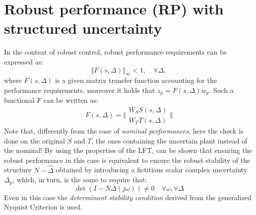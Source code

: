 \documentclass[a4paper, 12pt]{article}
\begin{document}
\section{Robust performance (RP) with structured uncertainty}
In the context of robust control, robust performance requirements can be expressed as: 
\begin{equation}
    \Vert F(s,\Delta) \Vert_\infty<1, \quad \forall\Delta, 
\end{equation}
where $F(s,\Delta)$ is a given matrix transfer function accounting for the performance requirements, moreover it holds that $z_p=F(s,\Delta)w_p$. Such a functional $F$ can be written as: 
\begin{equation}
    F(s,\Delta)=\bigg\Vert
        \begin{matrix}
            W_S S(s,\Delta)\\
            W_T T(s,\Delta)
        \end{matrix}
    \bigg\Vert 
\end{equation}
Note that, differently from the case of \textit{nominal performances}, here the check is done on the original $S$ and $T$, the ones containing the uncertain plant instead of the nominal!
By using the properties of the LFT, can be shown that ensuring the robust performance in this case is equivalent to ensure the robust stability of the structure $N-\hat{\Delta}$ obtained by introducing a fictitious scalar complex uncertainty $\Delta_p$, which, in turn, is the same to require that:
\begin{equation}\label{eq:RP_cond}
    \det(I-N\Delta(j\omega))\ne 0 \quad \forall \omega, \forall \Delta
\end{equation}
Even in this case the \textit{determinant stability condition} derived from the generalized Nyquist Criterion is used.
\end{document}
